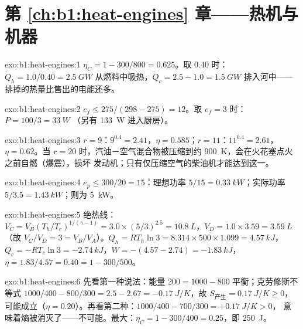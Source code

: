 \section*{第 \ref{ch:b1:heat-engines} 章——热机与机器}

\begin{solution}{exo:b1:heat-engines:1}
$\eta_C = 1 - 300/800 = 0.625$。取 $0.40$ 时：$\dot Q_h = 1.0/0.40 = \qty{2.5}{GW}$
从燃料中吸热，$\dot Q_c = 2.5 - 1.0 = \qty{1.5}{GW}$ 排入河中——
排掉的热量比售出的电能还多。
\end{solution}

\begin{solution}{exo:b1:heat-engines:2}
$e_f \leq 275/(298 - 275) = 12$。取 $e_f = 3$ 时：$P = 100/3 = \qty{33}{W}$
（另有 \qty{133}{W} 进入厨房）。
\end{solution}

\begin{solution}{exo:b1:heat-engines:3}
$r = 9$：$9^{0.4} = 2.41$，$\eta = 0.585$；$r = 11$：$11^{0.4} = 2.61$，
$\eta = 0.62$。当 $r = 20$ 时，汽油－空气混合物被压缩到约
\qty{900}{K}，会在火花塞点火之前自燃（爆震），损坏
发动机；只有仅压缩空气的柴油机才能达到这一。
\end{solution}

\begin{solution}{exo:b1:heat-engines:4}
$e_p \leq 300/20 = 15$：理想功率 $5/15 = \qty{0.33}{kW}$；实际功率 $5/3.5 =
\qty{1.43}{kW}$；则为 \qty{5}{kW}。
\end{solution}

\begin{solution}{exo:b1:heat-engines:5}
绝热线：$V_C = V_B(T_h/T_c)^{1/(\gamma-1)} = 3.0 \times (5/3)^{2.5} =
\qty{10.8}{L}$，$V_D = 1.0 \times 3.59 = \qty{3.59}{L}$（故 $V_C/V_D = 3 =
V_B/V_A$）。$Q_h = RT_h\ln3 = 8.314 \times 500 \times 1.099 = \qty{4.57}{kJ}$，
$Q_c = -RT_c\ln3 = \qty{-2.74}{kJ}$，$W = -(4.57 - 2.74) = \qty{-1.83}{kJ}$，
$\eta = 1.83/4.57 = 0.40 = 1 - 300/500$。
\end{solution}

\begin{solution}{exo:b1:heat-engines:6}
先看第一种说法：能量 $200 = 1000 - 800$ 平衡；克劳修斯不等式 $1000/400 - 800/300
= 2.5 - 2.67 = \qty{-0.17}{J/K}$，故 $S_{\text{产生}} = \qty{0.17}{J/K} \geq 0$，
可能成立（$\eta = 0.20$）。再看第二种：$1000/400 - 700/300 = +\qty{0.17}{J/K} > 0$，
意味着熵被消灭了——不可能。最大：$\eta_C = 1 -
300/400 = 0.25$，即 \qty{250}{J}。
\end{solution}

